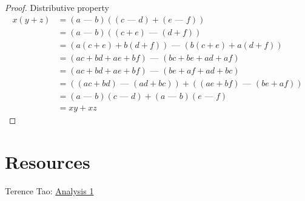 \documentclass[answers,12pt]{exam}
\newcommand{\fakeminus}{\text{ --- }}
\begin{document}
\begin{solution}
\begin{proof}
    Distributive property
    \begin{align*}
        x(y+z) &= (a \fakeminus b)((c \fakeminus d) + (e \fakeminus f)) \\
        &= (a \fakeminus b) ((c+e) \fakeminus (d+f)) \\\
        &= (a(c+e) + b(d+f)) \fakeminus (b(c+e) + a(d+f)) \\
        &= (ac + bd + ae + bf) \fakeminus (bc + be + ad + af) \\
        &= (ac + bd + ae + bf) \fakeminus (be + af + ad + bc) \\
        &= ((ac +bd) \fakeminus (ad + bc)) + ((ae + bf) \fakeminus (be + af)) \\
        &= (a \fakeminus b)(c \fakeminus d) + (a \fakeminus b)(e \fakeminus f) \\
        &= xy + xz
    \end{align*}
\end{proof}
\end{solution}




\section{Resources}
Terence Tao: \href{https://terrytao.wordpress.com/books/analysis-i/}{Analysis 1}
\end{document}
